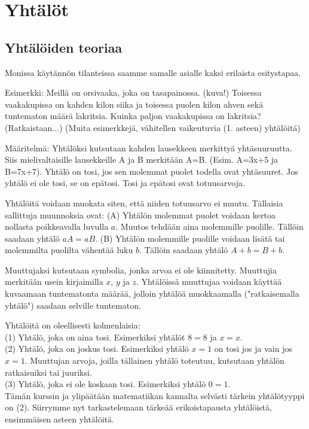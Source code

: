 %
\part{Yhtälöt}
\chapter{Yhtälöiden teoriaa}
Monissa käytännön tilanteissa saamme samalle asialle kaksi erilaista esitystapaa.

Esimerkki: Meillä on orsivaaka, joka on tasapainossa. (kuva!) Toisessa vaakakupissa on kahden kilon siika ja toisessa puolen kilon ahven sekä tuntematon määrä lakritsia. Kuinka paljon vaakakupissa on lakritsia? (Ratkaistaan...) (Muita esimerkkejä, vähitellen vaikeutuvia (1. asteen) yhtälöitä)

Määritelmä: Yhtälöksi kutsutaan kahden lausekkeen merkittyä yhtäsuuruutta. Siis mielivaltaisille lausekkeille A ja B merkitään A=B. (Esim. A=3x+5 ja B=7x+7). Yhtälö on tosi, jos sen molemmat puolet todella ovat yhtäsuuret. Jos yhtälö ei ole tosi, se on epätosi. Tosi ja epätosi ovat totuusarvoja.

Yhtälöitä voidaan muokata siten, että niiden totuusarvo ei muutu. Tällaisia sallittuja muunnoksia ovat:
(A) Yhtälön molemmat puolet voidaan kertoa nollasta poikkeavalla luvulla $a$. Muutos tehdään aina molemmille puolille. Tällöin saadaan yhtälö $aA = aB$.
(B) Yhtälön molemmille puolille voidaan lisätä tai molemmilta puolilta vähentää luku $b$. Tällöin saadaan yhtälö $A+b = B+b$.

Muuttujaksi kutsutaan symbolia, jonka arvoa ei ole kiinnitetty. Muuttujia merkitään usein kirjaimilla $x$, $y$ ja $z$. Yhtälöissä muuttujaa voidaan käyttää kuvaamaan tuntematonta määrää, jolloin yhtälöä muokkaamalla ("ratkaisemalla yhtälö") saadaan selville tuntematon.

Yhtälöitä on oleellisesti kolmenlaisia: \\
(1) Yhtälö, joka on aina tosi. Esimerkiksi yhtälöt $8=8$ ja $x=x$. \\
(2) Yhtälö, joka on joskus tosi. Esimerkiksi yhtälö $x=1$ on tosi jos ja vain jos $x=1$. Muuttujan arvoja, joilla tällainen yhtälö toteutuu, kutsutaan yhtälön ratkaisuiksi tai juuriksi. \\
(3) Yhtälö, joka ei ole koskaan tosi. Esimerkiksi yhtälö $0=1$. \\
Tämän kurssin ja ylipäätään matematiikan kannalta selvästi tärkein yhtälötyyppi on (2). Siirrymme nyt tarkastelemaan tärkeää erikoistapausta yhtälöistä, ensimmäisen asteen yhtälöitä.

